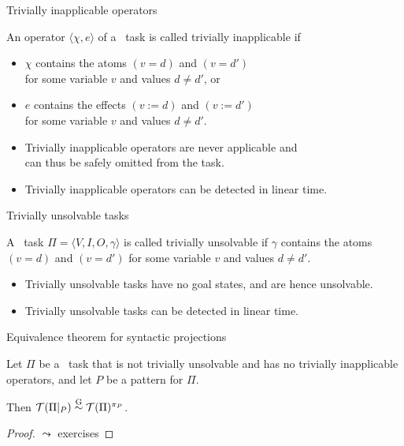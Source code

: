 \documentclass{gkibeamer}
\begin{document}
\begin{frame}{Trivially inapplicable operators}
  \begin{definition}
    An operator $\langle \chi, e\rangle$ of a \sasplus\ task is
    called \alert{trivially inapplicable} if
    \begin{itemize}
    \item $\chi$ contains the atoms $(v = d)$ and $(v = d')$ \\
      for some variable $v$ and values $d \neq d'$, or
    \item $e$ contains the effects $(v := d)$ and $(v := d')$ \\
      for some variable $v$ and values $d \neq d'$.
    \end{itemize}
  \end{definition}
  \begin{itemize}
  \item Trivially inapplicable operators are never applicable and \\
    can thus be safely omitted from the task.
  \item Trivially inapplicable operators can be detected in linear time.
  \end{itemize}
\end{frame}

\begin{frame}{Trivially unsolvable {\sasplus} tasks}
  \begin{definition}
    A \sasplus\ task $\Pi = \langle V, I, O, \gamma\rangle$ 
    is called \alert{trivially unsolvable} if
    $\gamma$ contains the atoms $(v = d)$ and $(v = d')$
    for some variable $v$ and values $d \neq d'$.
  \end{definition}
  \begin{itemize}
  \item Trivially unsolvable {\sasplus} tasks have no goal states,
    and are hence unsolvable.
  \item Trivially unsolvable {\sasplus} tasks can be detected in
    linear time.
  \end{itemize}
\end{frame}

\begin{frame}{Equivalence theorem for syntactic projections}
  \begin{theorem}
    Let $\Pi$ be a \sasplus\ task that is not trivially unsolvable
    and has no trivially inapplicable operators,
    and let $P$ be a pattern for $\Pi$.

    Then $\mathcal T(\Pi|_P) \stackrel{\textup{G}}{\sim} \mathcal T(\Pi)^{\pi_P}$.
  \end{theorem}
  \begin{proof}
    $\leadsto$ exercises
  \end{proof}
\end{frame}
\end{document}
